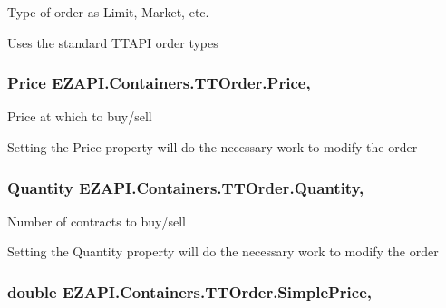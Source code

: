 Type of order as Limit, Market, etc. 

Uses the standard T\-T\-A\-P\-I order types\hypertarget{class_e_z_a_p_i_1_1_containers_1_1_t_t_order_a77d4a6274c77f8998f7b68e57bb0538a}{
\subsubsection[{Price}]{\setlength{\rightskip}{0pt plus 5cm}Price E\-Z\-A\-P\-I.\-Containers.\-T\-T\-Order.\-Price\hspace{0.3cm}{\ttfamily [get]}, {\ttfamily [set]}}}\label{class_e_z_a_p_i_1_1_containers_1_1_t_t_order_a77d4a6274c77f8998f7b68e57bb0538a}


Price at which to buy/sell 

Setting the Price property will do the necessary work to modify the order\hypertarget{class_e_z_a_p_i_1_1_containers_1_1_t_t_order_a0c797bc9194b17026dc9023bf15aad17}{
\subsubsection[{Quantity}]{\setlength{\rightskip}{0pt plus 5cm}Quantity E\-Z\-A\-P\-I.\-Containers.\-T\-T\-Order.\-Quantity\hspace{0.3cm}{\ttfamily [get]}, {\ttfamily [set]}}}\label{class_e_z_a_p_i_1_1_containers_1_1_t_t_order_a0c797bc9194b17026dc9023bf15aad17}


Number of contracts to buy/sell 

Setting the Quantity property will do the necessary work to modify the order\hypertarget{class_e_z_a_p_i_1_1_containers_1_1_t_t_order_a09e6c6a224c8029cc51aaeefad557cca}{
\subsubsection[{Simple\-Price}]{\setlength{\rightskip}{0pt plus 5cm}double E\-Z\-A\-P\-I.\-Containers.\-T\-T\-Order.\-Simple\-Price\hspace{0.3cm}{\ttfamily [get]}, {\ttfamily [set]}}}\label{class_e_z_a_p_i_1_1_containers_1_1_t_t_order_a09e6c6a224c8029cc51aaeefad557cca}


